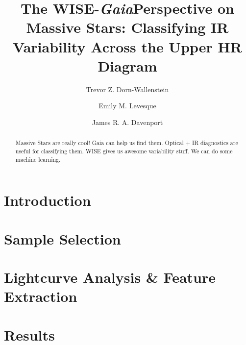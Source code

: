 \documentclass[twocolumn]{aastex62}
\newcommand\Gaia{{\it Gaia}}
\begin{document}
\title{The WISE-\Gaia Perspective on Massive Stars: Classifying IR Variability Across the Upper HR Diagram}


\author[0000-0003-3601-3180]{Trevor Z. Dorn-Wallenstein}

\author[0000-0003-2184-1581]{Emily M. Levesque}

\author[0000-0002-0637-835X]{James R. A. Davenport}

\begin{abstract}

Massive Stars are really cool! Gaia can help us find them. Optical + IR diagnostics are useful for classifying them. WISE gives us awesome variability stuff. We can do some machine learning.


\end{abstract}


\section{Introduction} \label{sec:intro}

\section{Sample Selection}\label{sec:sample}

\section{Lightcurve Analysis \& Feature Extraction}\label{sec:lightcurves}

\section{Results}\label{sec:results}
\end{document}
